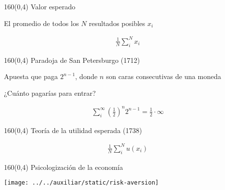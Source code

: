 \documentclass[shownotes,aspectratio=169]{beamer}
\begin{document}
\begin{frame}[plain]
 \begin{textblock}{160}(0,4)
  \centering \Large Valor esperado
 \end{textblock}
 \vspace{1cm}
 
 \centering
 El promedio de todos los $N$ resultados posibles $x_i$ 
 
 \begin{align*}
  \frac{1}{N} \sum_i^N x_i
 \end{align*}

 
\end{frame}

\begin{frame}[plain]
 \begin{textblock}{160}(0,4)
  \centering \Large Paradoja de San Petersburgo (1712)
 \end{textblock}
 \vspace{1cm}

 \centering
 Apuesta que paga $2^{n-1}$, donde $n$ son caras consecutivas de una moneda

 \vspace{0.5cm}
 
 ¿Cuánto pagarías para entrar?
 
 \pause
 \begin{align*}
 \sum_i^{\infty} \left(\frac{1}{2} \right)^n 2^{n-1} = \frac{1}{2} \cdot \infty
 \end{align*}
 
\end{frame}

\begin{frame}[plain]
 \begin{textblock}{160}(0,4)
  \centering \Large Teoría de la utilidad esperada (1738)
 \end{textblock}


 \begin{align*}
  \frac{1}{N} \sum_i^N u(x_i)
 \end{align*}
 
 \end{frame}

 

 
 \begin{frame}[plain]
 \begin{textblock}{160}(0,4)
  \centering \Large Psicologización de la economía
\end{textblock}
\centering
\vspace{1cm}
 
\texttt{[image: ../../auxiliar/static/risk-aversion]}

 \end{frame}
\end{document}
